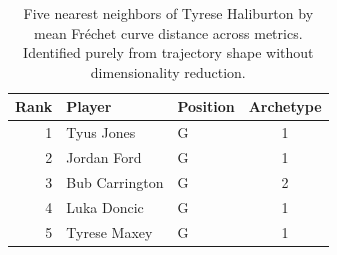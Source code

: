 \begin{table}[htbp]
  \centering\small
  \begin{tabular}{rllc}
    \toprule
    Rank & Player & Position & Archetype \\
    \midrule
    1 & Tyus Jones & G & 1 \\
    2 & Jordan Ford & G & 1 \\
    3 & Bub Carrington & G & 2 \\
    4 & Luka Doncic & G & 1 \\
    5 & Tyrese Maxey & G & 1 \\
    \bottomrule
  \end{tabular}
  \caption{Five nearest neighbors of Tyrese Haliburton by mean Fr\'{e}chet curve distance across metrics. Identified purely from trajectory shape without dimensionality reduction.}
  \label{tab:Tyrese_Haliburton_frechet_curve_neighbors}
\end{table}

